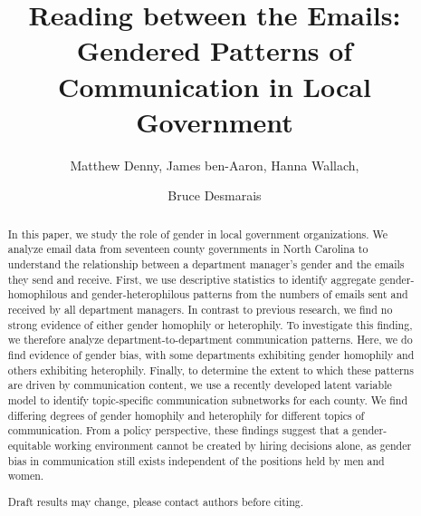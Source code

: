 \documentclass{pnastwo}
\begin{document}
\title{Reading between the Emails: Gendered Patterns of Communication in Local Government}

\author{
Matthew Denny,
James ben-Aaron,
Hanna Wallach,
\and Bruce Desmarais
}

\contributor{\vspace{-.25cm}}


\maketitle

%
\begin{article}
\begin{abstract}
	
{In this paper, we study the role of gender in local government
organizations. We analyze email data from seventeen county
governments in North Carolina to understand the relationship
between a department manager's gender and the emails they send
and receive. First, we use descriptive statistics to identify
aggregate gender-homophilous and gender-heterophilous patterns
from the numbers of emails sent and received by all department
managers. In contrast to previous research, we find no strong
evidence of either gender homophily or heterophily. To
investigate this finding, we therefore analyze
department-to-department communication patterns. Here, we do find
evidence of gender bias, with some departments exhibiting gender
homophily and others exhibiting heterophily. Finally, to
determine the extent to which these patterns are driven by
communication content, we use a recently developed latent
variable model to identify topic-specific communication
subnetworks for each county. We find differing degrees of gender
homophily and heterophily for different topics of
communication. From a policy perspective, these findings suggest
that a gender-equitable working environment cannot be created by
hiring decisions alone, as gender bias in communication still
exists independent of the positions held by men and women. 

\begin{center}
Draft results may change, please contact authors before citing.
\end{center}
}
\end{abstract} 



\end{article}
\end{document}
